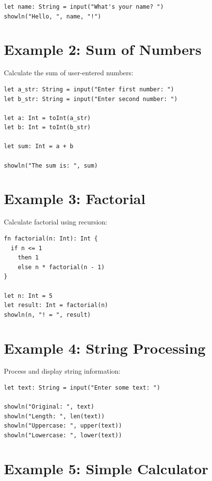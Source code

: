 \documentclass[11pt,twoside,openright]{book}
\begin{document}
\begin{lstlisting}[language=ConstructLang]
let name: String = input("What's your name? ")
showln("Hello, ", name, "!")
\end{lstlisting}

\section{Example 2: Sum of Numbers}

Calculate the sum of user-entered numbers:

\begin{lstlisting}[language=ConstructLang]
let a_str: String = input("Enter first number: ")
let b_str: String = input("Enter second number: ")

let a: Int = toInt(a_str)
let b: Int = toInt(b_str)

let sum: Int = a + b

showln("The sum is: ", sum)
\end{lstlisting}

\section{Example 3: Factorial}

Calculate factorial using recursion:

\begin{lstlisting}[language=ConstructLang]
fn factorial(n: Int): Int {
  if n <= 1
    then 1
    else n * factorial(n - 1)
}

let n: Int = 5
let result: Int = factorial(n)
showln(n, "! = ", result)
\end{lstlisting}

\section{Example 4: String Processing}

Process and display string information:

\begin{lstlisting}[language=ConstructLang]
let text: String = input("Enter some text: ")

showln("Original: ", text)
showln("Length: ", len(text))
showln("Uppercase: ", upper(text))
showln("Lowercase: ", lower(text))
\end{lstlisting}

\section{Example 5: Simple Calculator}
\end{document}

